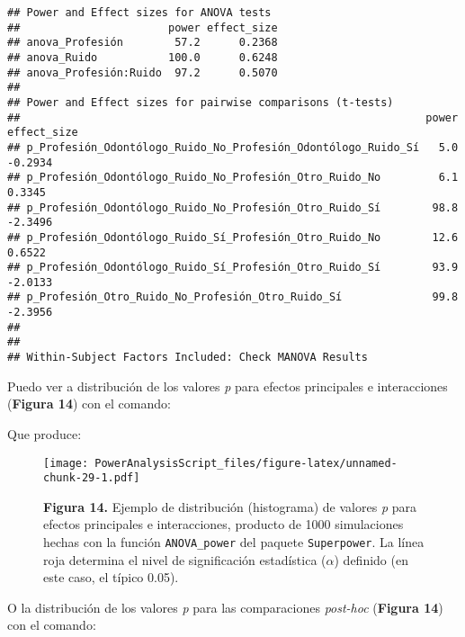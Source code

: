 \documentclass[
]{article}
\newenvironment{Shaded}{\begin{snugshade}}{\end{snugshade}}
\newcommand{\NormalTok}[1]{\textcolor[rgb]{0.81,0.81,0.76}{#1}}
\newcommand{\SpecialCharTok}[1]{\textcolor[rgb]{0.24,0.68,0.91}{#1}}
\begin{document}
\begin{verbatim}
## Power and Effect sizes for ANOVA tests
##                       power effect_size
## anova_Profesión        57.2      0.2368
## anova_Ruido           100.0      0.6248
## anova_Profesión:Ruido  97.2      0.5070
## 
## Power and Effect sizes for pairwise comparisons (t-tests)
##                                                               power effect_size
## p_Profesión_Odontólogo_Ruido_No_Profesión_Odontólogo_Ruido_Sí   5.0     -0.2934
## p_Profesión_Odontólogo_Ruido_No_Profesión_Otro_Ruido_No         6.1      0.3345
## p_Profesión_Odontólogo_Ruido_No_Profesión_Otro_Ruido_Sí        98.8     -2.3496
## p_Profesión_Odontólogo_Ruido_Sí_Profesión_Otro_Ruido_No        12.6      0.6522
## p_Profesión_Odontólogo_Ruido_Sí_Profesión_Otro_Ruido_Sí        93.9     -2.0133
## p_Profesión_Otro_Ruido_No_Profesión_Otro_Ruido_Sí              99.8     -2.3956
## 
## 
## Within-Subject Factors Included: Check MANOVA Results
\end{verbatim}

Puedo ver a distribución de los valores \emph{p} para efectos
principales e interacciones (\textbf{Figura 14}) con el comando:

\begin{Shaded}
\end{Shaded}

Que produce:

\begin{figure}
\centering
\texttt{[image: PowerAnalysisScript\_files/figure-latex/unnamed-chunk-29-1.pdf]}
\caption{\textbf{Figura 14.} Ejemplo de distribución (histograma) de
valores \emph{p} para efectos principales e interacciones, producto de
1000 simulaciones hechas con la función \texttt{ANOVA\_power} del
paquete \texttt{Superpower}. La línea roja determina el nivel de
significación estadística (\(\alpha\)) definido (en este caso, el típico
0.05).}
\end{figure}

O la distribución de los valores \emph{p} para las comparaciones
\emph{post-hoc} (\textbf{Figura 14}) con el comando:

\begin{Shaded}
\end{Shaded}
\end{document}
